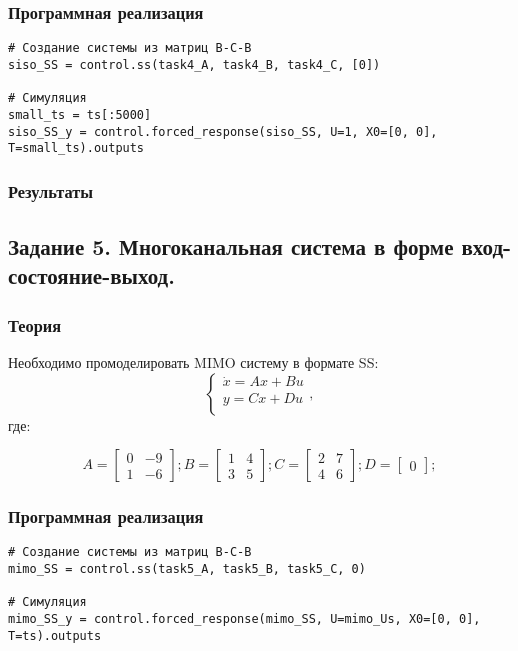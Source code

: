 \documentclass[16pt]{article}
\begin{document}
\subsubsection{Программная реализация}
\begin{verbatim}
# Создание системы из матриц В-С-В
siso_SS = control.ss(task4_A, task4_B, task4_C, [0])

# Симуляция
small_ts = ts[:5000]
siso_SS_y = control.forced_response(siso_SS, U=1, X0=[0, 0], T=small_ts).outputs
\end{verbatim}

\subsubsection{Результаты}


\newpage
\subsection{Задание 5. Многоканальная система в форме вход-состояние-выход.}
\subsubsection{Теория}
Необходимо промоделировать MIMO систему в формате SS:
\[ 
    \begin{cases}
        \dot{x} = Ax + Bu \\
        y = Cx + Du \\
    \end{cases},
\]
где:

\[ 
    A = \begin{bmatrix}
        0 &  -9 \\
        1 &  -6 
        \end{bmatrix};
        B = \begin{bmatrix}
            1 & 4 \\
            3 & 5
            \end{bmatrix};
        C = \begin{bmatrix}
            2 & 7 \\
            4 & 6
            \end{bmatrix};
        D = \begin{bmatrix}
            0
            \end{bmatrix};
\]

\subsubsection{Программная реализация}
\begin{verbatim}
# Создание системы из матриц В-С-В
mimo_SS = control.ss(task5_A, task5_B, task5_C, 0)

# Симуляция
mimo_SS_y = control.forced_response(mimo_SS, U=mimo_Us, X0=[0, 0], T=ts).outputs
\end{verbatim}
\end{document}
